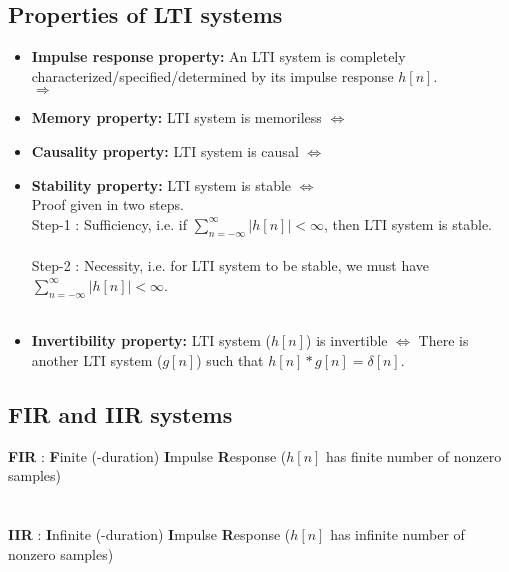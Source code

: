 \documentclass[10pt,a4paper,report]{report}       %
\begin{document}
\subsection{Properties of LTI systems}
\begin{itemize}
 \item \textbf{Impulse response property:} An LTI system is completely characterized/specified/determined by its impulse response $h[n]$.\\ $\Longrightarrow$ \\
 \item \textbf{Memory property:} LTI system is memoriless $\Longleftrightarrow$ \\
 \vspace{2cm}
 \item \textbf{Causality property:} LTI system is causal $\Longleftrightarrow$ \\
 \vspace{2cm}
 \item \textbf{Stability property:} LTI system is stable $\Longleftrightarrow$ \\
 Proof given in two steps.\\
 Step-1 : Sufficiency, i.e. if $\sum_{n=-\infty}^{\infty}|h[n]|<\infty$, then LTI system is stable.\\ 
 \vspace{3cm}\\
 Step-2 : Necessity, i.e. for LTI system to be stable, we must have $\sum_{n=-\infty}^{\infty}|h[n]|<\infty$.\\
 \vspace{5.5cm}\\
 \item \textbf{Invertibility property:} LTI system ($h[n]$) is invertible $\Longleftrightarrow$ There is another LTI system ($g[n]$) such that $h[n]*g[n]=\delta[n]$.\\
 \vspace{1.5cm}
\end{itemize}

\subsection{FIR and IIR systems}
\textbf{FIR} : \textbf{F}inite (-duration) \textbf{I}mpulse \textbf{R}esponse ($h[n]$ has finite number of nonzero samples)\\
\hspace*{1cm} \ex \\ \\
\textbf{IIR} : \textbf{I}nfinite (-duration) \textbf{I}mpulse \textbf{R}esponse ($h[n]$ has infinite number of nonzero samples)\\
\hspace*{1cm} \ex \\
\end{document}
